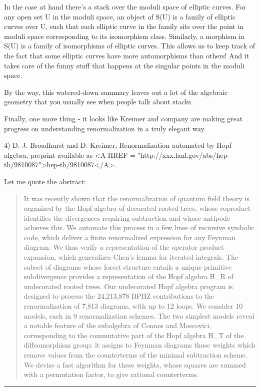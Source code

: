 In the case at hand there's a stack over the moduli space of elliptic
curves.  For any open set U in the moduli space, an object of S(U) is a
family of elliptic curves over U, such that each elliptic curve in the
family sits over the point in moduli space corresponding to its
isomorphism class.  Similarly, a morphism in S(U) is a family of
isomorphisms of elliptic curves.  This allows us to keep track of the
fact that some elliptic curves have more automorphisms than others!  And
it takes care of the funny stuff that happens at the singular points in
the moduli space.

By the way, this watered-down summary leaves out a lot of the
algebraic geometry that you usually see when people talk about stacks.

Finally, one more thing - it looks like Kreimer and company are making
great progress on understanding renormalization in a truly elegant way. 

4) D. J. Broadhurst and D. Kreimer, Renormalization automated by Hopf algebra,
preprint available as 
<A HREF = "http://xxx.lanl.gov/abs/hep-th/9810087">hep-th/9810087</A>.  


Let me quote the abstract:

\begin{quote}
It was recently shown that the renormalization of quantum field theory
is organized by the Hopf algebra of decorated rooted trees, whose
coproduct identifies the divergences requiring subtraction and whose
antipode achieves this. We automate this process in a few lines of
recursive symbolic code, which deliver a finite renormalized expression
for any Feynman diagram. We thus verify a representation of the operator
product expansion, which generalizes Chen's lemma for iterated
integrals. The subset of diagrams whose forest structure entails a
unique primitive subdivergence provides a representation of the Hopf
algebra H_{R} of undecorated rooted trees. Our undecorated Hopf algebra
program is designed to process the 24,213,878 BPHZ contributions to the
renormalization of 7,813 diagrams, with up to 12 loops. We consider 10
models, each in 9 renormalization schemes. The two simplest models
reveal a notable feature of the subalgebra of Connes and Moscovici,
corresponding to the commutative part of the Hopf algebra H_{T} of the
diffeomorphism group: it assigns to Feynman diagrams those weights which
remove \zeta  values from the counterterms of the minimal subtraction
scheme. We devise a fast algorithm for these weights, whose squares are
summed with a permutation factor, to give rational counterterms.
\end{quote}



 \par\noindent\rule{\textwidth}{0.4pt}

